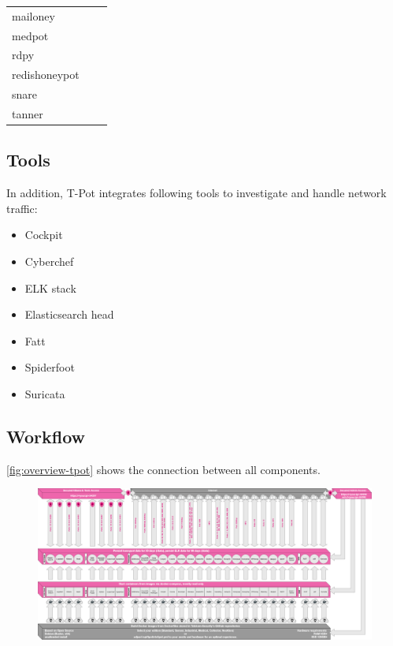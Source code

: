 \begin{table}[h]
\begin{tabularx}{\linewidth}{l|l|l}
        mailoney                                 &                      &               \\
        medpot \cite{medpot2021}                 &                      &               \\
        rdpy \cite{rdpy2021}                     &                      &               \\
        redishoneypot                            &                      &               \\
        snare \cite{snare2021}                   &                      &               \\
        tanner \cite{tanner2021}                 &                      &               \\
        \bottomrule
    \end{tabularx}
    \label{tab:overview-honeypots}
\end{table}

\subsection{Tools}

In addition, T-Pot integrates following tools to investigate and handle network traffic:

\begin{itemize}
    \item Cockpit
    \item Cyberchef
    \item ELK stack
    \item Elasticsearch head
    \item Fatt
    \item Spiderfoot
    \item Suricata
\end{itemize}

\subsection{Workflow}

\autoref{fig:overview-tpot} shows the connection between all components.

\begin{figure}
    \centering
    \includegraphics[width=\textwidth]{figures/architecture.png}
    \caption{}
    \label{fig:overview-tpot}
\end{figure}

